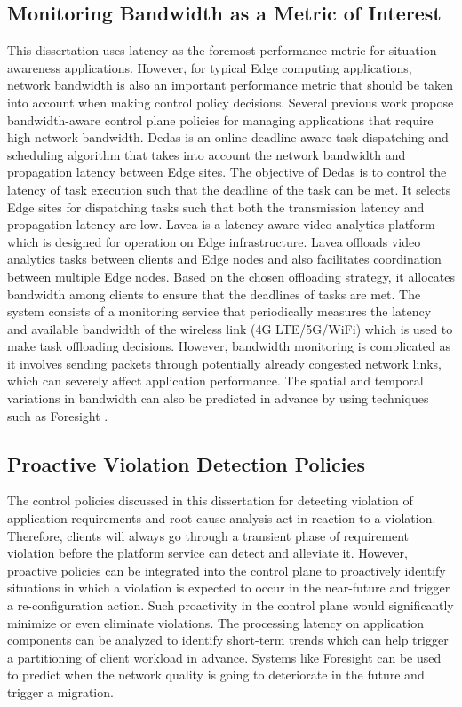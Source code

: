 \subsection{Monitoring Bandwidth as a Metric of Interest}
This dissertation uses latency as the foremost performance metric for situation-awareness applications. However, for typical Edge computing applications, network bandwidth is also an important performance metric that should be taken into account when making control policy decisions. Several previous work propose bandwidth-aware control plane policies for managing applications that require high network bandwidth. Dedas \cite{dedas} is an online deadline-aware task dispatching and scheduling algorithm that takes into account the network bandwidth and propagation latency between Edge sites. The objective of Dedas is to control the latency of task execution such that the deadline of the task can be met. It selects Edge sites for dispatching tasks such that both the transmission latency and propagation latency are low. Lavea \cite{lavea} is a latency-aware video analytics platform which is designed for operation on Edge infrastructure. Lavea offloads video analytics tasks between clients and Edge nodes and also facilitates coordination between multiple Edge nodes. Based on the chosen offloading strategy, it allocates bandwidth among clients to ensure that the deadlines of tasks are met. The system consists of a monitoring service that periodically measures the latency and available bandwidth of the wireless link (4G LTE/5G/WiFi) which is used to make task offloading decisions. However, bandwidth monitoring is complicated as it involves sending packets through potentially already congested network links, which can severely affect application performance. The spatial and temporal variations in bandwidth can also be predicted in advance by using techniques such as Foresight \cite{foresight}.

\subsection{Proactive Violation Detection Policies}
The control policies discussed in this dissertation for detecting violation of application requirements and root-cause analysis act in reaction to a violation. Therefore, clients will always go through a transient phase of requirement violation before the platform service can detect and alleviate it. However, proactive policies can be integrated into the control plane to proactively identify situations in which a violation is expected to occur in the near-future and trigger a re-configuration action. Such proactivity in the control plane would significantly minimize or even eliminate violations. The processing latency on application components can be analyzed to identify short-term trends which can help trigger a partitioning of client workload in advance. Systems like Foresight \cite{foresight} can be used to predict when the network quality is going to deteriorate in the future and trigger a migration.